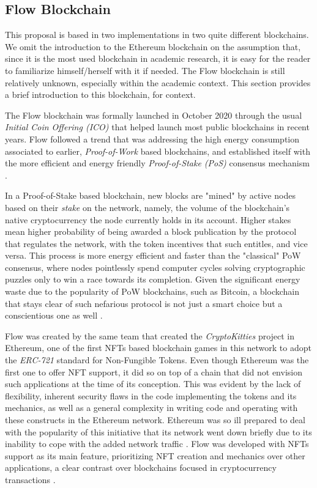 \documentclass[../main.tex]{subfiles}
\begin{document}
\subsection{Flow Blockchain}
This proposal is based in two implementations in two quite different blockchains. We omit the introduction to the Ethereum blockchain on the assumption that, since it is the most used blockchain in academic research, it is easy for the reader to familiarize himself/herself with it if needed. The Flow blockchain is still relatively unknown, especially within the academic context. This section provides a brief introduction to this blockchain, for context.
\par
The Flow blockchain was formally launched in October 2020 through the usual \textit{Initial Coin Offering (ICO)} that helped launch most public blockchains in recent years. Flow followed a trend that was addressing the high energy consumption associated to earlier, \textit{Proof-of-Work} based blockchains, and established itself with the more efficient and energy friendly \textit{Proof-of-Stake (PoS)} consensus mechanism \cite{Hentschel2019a}.
\par
In a Proof-of-Stake based blockchain, new blocks are "mined" by active nodes based on their \textit{stake} on the network, namely, the volume of the blockchain's native cryptocurrency the node currently holds in its account. Higher stakes mean higher probability of being awarded a block publication by the protocol that regulates the network, with the token incentives that such entitles, and vice versa. This process is more energy efficient and faster than the "classical" PoW consensus, where nodes pointlessly spend computer cycles solving cryptographic puzzles only to win a race towards its completion. Given the significant energy waste due to the popularity of PoW blockchains, such as Bitcoin, a blockchain that stays clear of such nefarious protocol is not just a smart choice but a conscientious one as well \cite{Hentschel2019b}.
\par
Flow was created by the same team that created the \textit{CryptoKitties} project in Ethereum, one of the first NFTs based blockchain games in this network to adopt the \textit{ERC-721} standard for Non-Fungible Tokens. Even though Ethereum was the first one to offer NFT support, it did so on top of a chain that did not envision such applications at the time of its conception. This was evident by the lack of flexibility, inherent security flaws in the code implementing the tokens and its mechanics, as well as a general complexity in writing code and operating with these constructs in the Ethereum network. Ethereum was so ill prepared to deal with the popularity of this initiative that its network went down briefly due to its inability to cope with the added network traffic \cite{bbc2017}. Flow was developed with NFTs support as its main feature, prioritizing NFT creation and mechanics over other applications, a clear contrast over blockchains focused in cryptocurrency transactions \cite{Gharegozlou2019}.
\end{document}
